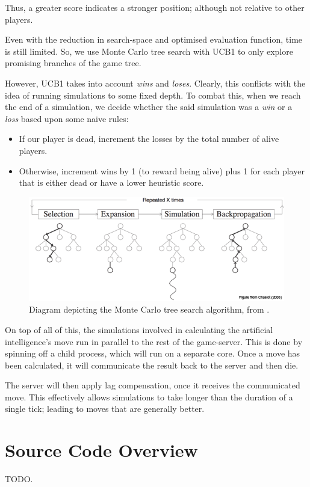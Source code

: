 \documentclass{standalone}
\begin{document}
		Thus, a greater score indicates a stronger position; although not relative to other players.

		Even with the reduction in search-space and optimised evaluation function, time is still limited. So, we use Monte Carlo tree search \parencite{MonteCarloTreeSearch} with UCB1 to only explore promising branches of the game tree.

		However, UCB1 takes into account \emph{wins} and \emph{loses}. Clearly, this conflicts with the idea of running simulations to some fixed depth. To combat this, when we reach the end of a simulation, we decide whether the said simulation was a \emph{win} or a \emph{loss} based upon some naive rules:
		\begin{itemize}
			\item If our player is dead, increment the losses by the total number of alive players.
			\item Otherwise, increment wins by 1 (to reward being alive) plus 1 for each player that is either dead or have a lower heuristic score.
		\end{itemize}

		\begin{figure}[!htbp]
			\centering
			\includegraphics[width=.8\textwidth]{resources/images/mcts.png}
			\caption{Diagram depicting the Monte Carlo tree search algorithm, from \parencite{MonteCarloTreeSearchDiagram}.}
		\end{figure}

		On top of all of this, the simulations involved in calculating the artificial intelligence's move run in parallel to the rest of the game-server. This is done by spinning off a child process, which will run on a separate core. Once a move has been calculated, it will communicate the result back to the server and then die.

		The server will then apply lag compensation, once it receives the communicated move. This effectively allows simulations to take longer than the duration of a single tick; leading to moves that are generally better.

	\section{Source Code Overview}
		TODO.
\end{document}
